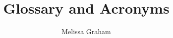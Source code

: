 \documentclass[DM,authoryear,toc]{lsstdoc}
\title{Glossary and Acronyms}
\author   {Melissa Graham}
\date{\vcsDate}
\begin{document}
\maketitle

\renewcommand{\thepage}{\arabic{page}}%

\setcounter{page}{1}%









 
\end{document}
